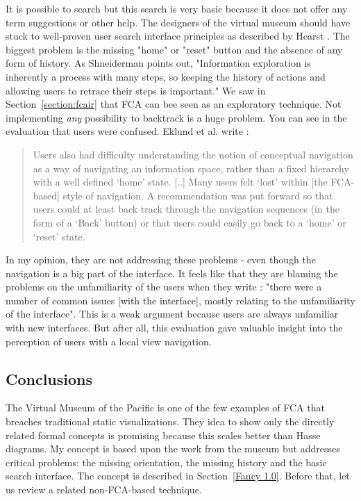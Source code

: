 \documentclass[11pt]{report}
\begin{document}
It is possible to search but this search is very basic because it does not offer any term suggestions or other help. The designers of the virtual museum should have stuck to well-proven user search interface principles as described by Hearst \cite{Hearst2009}. The biggest problem is the missing "home" or "reset" button and the absence of any form of history. As Shneiderman \cite{Shneiderman1996} points out, "Information exploration is inherently a process with many steps, so keeping the history of actions and allowing users to retrace their steps is important." We saw in Section~\ref{section:fcair} that FCA can bee seen as an exploratory technique. Not implementing \textit{any} possibility to backtrack is a huge problem. You can see in the evaluation that users were confused. Eklund et al. write \cite{Eklund2012}:
 \begin{quote}
 Users also had difficulty understanding the notion of conceptual navigation as a way of navigating an information space, rather than a fixed hierarchy with a well defined `home' state. [..] Many users felt `lost' within [the FCA-based] style of navigation. A recommendation was put forward so that users could at least back track through the navigation sequences (in the form of a `Back' button) or that users could easily go back to a `home' or `reset' state.
 \end{quote}
  In my opinion, they are not addressing these problems - even though the navigation is a big part of the interface. It feels like that they are blaming the problems on the unfamiliarity of the users when they write \cite{Eklund2012}: "there were a number of common issues [with the interface], mostly relating to the unfamiliarity of the interface". This is a weak argument because users are always unfamiliar with new interfaces. But after all, this evaluation gave valuable insight into the perception of users with a local view navigation.
  
\subsection{Conclusions}

The Virtual Museum of the Pacific is one of the few examples of FCA that breaches traditional static visualizations. They idea to show only the directly related formal concepts is promising because this scales better than Hasse diagrams. My concept is based upon the work from the museum but addresses critical problems: the missing orientation, the missing history and the basic search interface. The concept is described in Section~\ref{Fancy 1.0}. Before that, let us review a related non-FCA-based technique.
\end{document}
